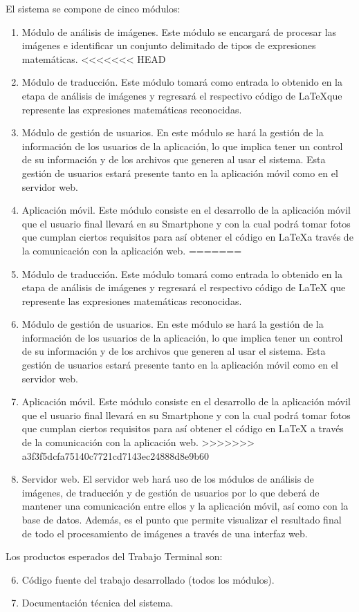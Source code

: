 El sistema se compone de cinco módulos:
\begin{enumerate}
    \item Módulo de análisis de imágenes. Este módulo se encargará de procesar las imágenes e identificar un conjunto delimitado de tipos de expresiones matemáticas.
<<<<<<< HEAD
    \item Módulo de traducción. Este módulo tomará como entrada lo obtenido en la etapa de análisis de imágenes y regresará el respectivo código de \LaTeX que represente las expresiones matemáticas reconocidas.
    
    \item Módulo de gestión de usuarios. En este módulo se hará la gestión de la información de los usuarios de la aplicación, lo que implica tener un control de su información y de los archivos que generen al usar el sistema. Esta gestión de usuarios estará presente tanto en la aplicación móvil como en el servidor web.

    \item Aplicación móvil. Este módulo consiste en el desarrollo de la aplicación móvil que el usuario final llevará en su Smartphone y con la cual podrá tomar fotos que cumplan ciertos requisitos para así obtener el código en \LaTeX a través de la comunicación con la aplicación web.
=======
    \item Módulo de traducción. Este módulo tomará como entrada lo obtenido en la etapa de análisis de imágenes y regresará el respectivo código de \LaTeX{} que represente las expresiones matemáticas reconocidas.
    
    \item Módulo de gestión de usuarios. En este módulo se hará la gestión de la información de los usuarios de la aplicación, lo que implica tener un control de su información y de los archivos que generen al usar el sistema. Esta gestión de usuarios estará presente tanto en la aplicación móvil como en el servidor web.

    \item Aplicación móvil. Este módulo consiste en el desarrollo de la aplicación móvil que el usuario final llevará en su Smartphone y con la cual podrá tomar fotos que cumplan ciertos requisitos para así obtener el código en \LaTeX{} a través de la comunicación con la aplicación web.
>>>>>>> a3f3f5dcfa75140c7721cd7143ec24888d8e9b60

    \item Servidor web. El servidor web hará uso de los módulos de análisis de imágenes, de traducción y de gestión de usuarios por lo que deberá de mantener una comunicación entre ellos y la aplicación móvil, así como con la base de datos. Además, es el punto que permite visualizar el resultado final de todo el procesamiento de imágenes a través de una interfaz web.
\end{enumerate}
Los productos esperados del Trabajo Terminal son:
\begin{enumerate}
    \setcounter{enumi}{5}
    \item Código fuente del trabajo desarrollado (todos los módulos).
    \item Documentación técnica del sistema.
\end{enumerate}

